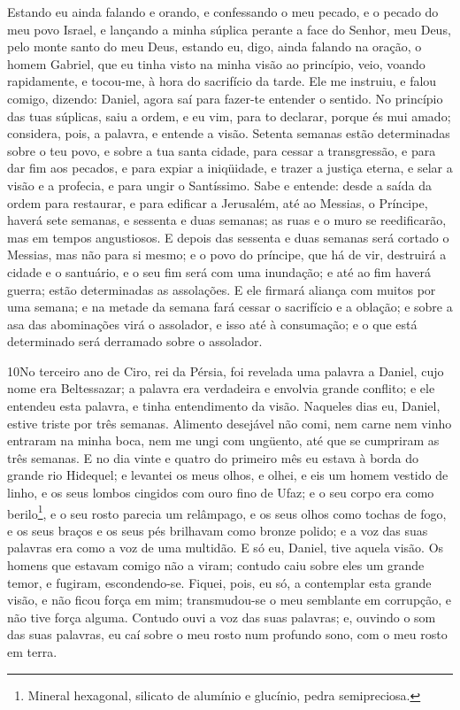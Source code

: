 Estando eu ainda falando e orando, e confessando o meu pecado, e
o pecado do meu povo Israel, e lançando a minha súplica perante a
face do Senhor, meu Deus, pelo monte santo do meu Deus,
estando eu, digo, ainda falando na oração, o homem Gabriel,
que eu tinha visto na minha visão ao princípio, veio, voando
rapidamente, e tocou-me, à hora do sacrifício da tarde. Ele
me instruiu, e falou comigo, dizendo: Daniel, agora saí para
fazer-te entender o sentido. No princípio das tuas súplicas,
saiu a ordem, e eu vim, para to declarar, porque és mui amado;
considera, pois, a palavra, e entende a visão. Setenta
semanas estão determinadas sobre o teu povo, e sobre a tua santa
cidade, para cessar a transgressão, e para dar fim aos pecados, e
para expiar a iniqüidade, e trazer a justiça eterna, e selar a visão
e a profecia, e para ungir o Santíssimo. Sabe e entende:
desde a saída da ordem para restaurar, e para edificar a Jerusalém,
até ao Messias, o Príncipe, haverá sete semanas, e sessenta e duas
semanas; as ruas e o muro se reedificarão, mas em tempos
angustiosos. E depois das sessenta e duas semanas será
cortado o Messias, mas não para si mesmo; e o povo do príncipe, que
há de vir, destruirá a cidade e o santuário, e o seu fim será com
uma inundação; e até ao fim haverá guerra; estão determinadas as
assolações. E ele firmará aliança com muitos por uma semana;
e na metade da semana fará cessar o sacrifício e a oblação; e sobre
a asa das abominações virá o assolador, e isso até à consumação; e o
que está determinado será derramado sobre o assolador.

\medskip

\lettrine{10} No terceiro ano de Ciro, rei da Pérsia, foi
revelada uma palavra a Daniel, cujo nome era Beltessazar; a palavra
era verdadeira e envolvia grande conflito; e ele entendeu esta
palavra, e tinha entendimento da visão. Naqueles dias eu,
Daniel, estive triste por três semanas. Alimento desejável não
comi, nem carne nem vinho entraram na minha boca, nem me ungi com
ungüento, até que se cumpriram as três semanas. E no dia vinte e
quatro do primeiro mês eu estava à borda do grande rio Hidequel;
e levantei os meus olhos, e olhei, e eis um homem vestido de
linho, e os seus lombos cingidos com ouro fino de Ufaz; e o seu
corpo era como berilo\footnote{Mineral hexagonal, silicato de
alumínio e glucínio, pedra semipreciosa.}, e o seu rosto parecia um
relâmpago, e os seus olhos como tochas de fogo, e os seus braços e
os seus pés brilhavam como bronze polido; e a voz das suas palavras
era como a voz de uma multidão. E só eu, Daniel, tive aquela
visão. Os homens que estavam comigo não a viram; contudo caiu sobre
eles um grande temor, e fugiram, escondendo-se. Fiquei, pois, eu
só, a contemplar esta grande visão, e não ficou força em mim;
transmudou-se o meu semblante em corrupção, e não tive força alguma.
Contudo ouvi a voz das suas palavras; e, ouvindo o som das suas
palavras, eu caí sobre o meu rosto num profundo sono, com o meu
rosto em terra.

